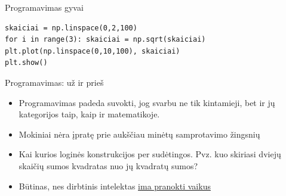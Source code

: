 \documentclass{beamer}
\begin{document}
\begin{frame}[fragile]{Programavimas gyvai}
\begin{verbatim}
skaiciai = np.linspace(0,2,100)
for i in range(3): skaiciai = np.sqrt(skaiciai)
plt.plot(np.linspace(0,10,100), skaiciai)
plt.show()
\end{verbatim}
\end{frame}

\begin{frame}[fragile]{Programavimas: už ir prieš}
\begin{itemize}
\item Programavimas padeda suvokti, jog svarbu ne tik kintamieji, bet ir jų kategorijos taip, kaip ir matematikoje.
\item Mokiniai nėra įpratę prie aukščiau minėtų samprotavimo žingsnių
\item Kai kurios loginės konstrukcijos per sudėtingos. Pvz. kuo skiriasi dviejų skaičių sumos kvadratas nuo jų kvadratų sumos?
\item Būtinas, nes dirbtinis intelektas \href{https://www.youtube.com/watch?v=wL7tSgUpy8w}{ima pranokti vaikus}
\end{itemize}
\end{frame}
\end{document}
